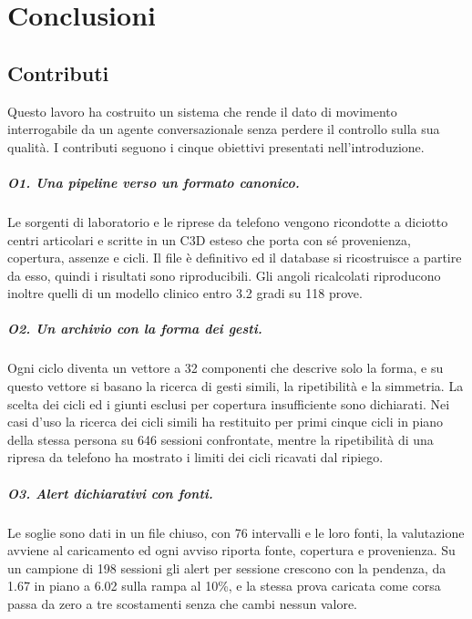 \chapter{Conclusioni}
\label{chap:conclusioni}

\section{Contributi}
\label{sec:ch7:contributi}

Questo lavoro ha costruito un sistema che rende il dato di movimento
interrogabile da un agente conversazionale senza perdere il controllo sulla sua qualità. I
contributi seguono i cinque obiettivi presentati nell'introduzione.

\paragraph{O1. Una pipeline verso un formato canonico.} Le sorgenti di
laboratorio e le riprese da telefono vengono ricondotte a diciotto centri
articolari e scritte in un C3D esteso che porta con sé provenienza, copertura,
assenze e cicli. Il file è definitivo ed il database si ricostruisce a partire da
esso, quindi i risultati sono riproducibili. Gli angoli ricalcolati riproducono
inoltre quelli di un modello clinico entro 3.2 gradi su 118 prove.

\paragraph{O2. Un archivio con la forma dei gesti.} Ogni ciclo diventa un vettore
a 32 componenti che descrive solo la forma, e su questo vettore si basano la
ricerca di gesti simili, la ripetibilità e la simmetria. La scelta dei cicli ed i
giunti esclusi per copertura insufficiente sono dichiarati. Nei casi d'uso la
ricerca dei cicli simili ha restituito per primi cinque cicli in piano della
stessa persona su 646 sessioni confrontate, mentre la ripetibilità di una ripresa
da telefono ha mostrato i limiti dei cicli ricavati dal ripiego.

\paragraph{O3. Alert dichiarativi con fonti.} Le soglie sono dati in un file
chiuso, con 76 intervalli e le loro fonti, la valutazione avviene al caricamento
ed ogni avviso riporta fonte, copertura e provenienza. Su un campione di 198
sessioni gli alert per sessione crescono con la pendenza, da 1.67 in piano a 6.02
sulla rampa al 10\%, e la stessa prova caricata come corsa passa da zero a tre
scostamenti senza che cambi nessun valore.

